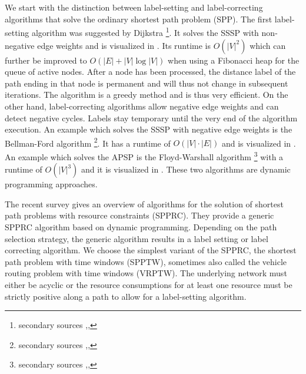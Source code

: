 \section{}
We start with the distinction between label-setting \cite[ch. 4]{ahuja1993network} and label-correcting \cite[ch. 5]{ahuja1993network} algorithms that solve the ordinary shortest path problem (SPP).
The first label-setting algorithm was suggested by Dijkstra \cite{dijkstra1959note}\footnote{secondary sources \cite[sec. 4.5]{ahuja1993network},\cite[sec. 24.3]{cormen2009introduction},\cite[sec. 3.7, p. 83]{jungnickel2013graphs}}. It solves the SSSP with non-negative edge weights and is visualized in \cite{velden2014idp}. Its runtime is $O(|V|^2)$ which can further be improved to $O(|E| + |V| \log |V|)$ when using a Fibonacci heap for the queue of active nodes. After a node has been processed, the distance label of the path ending in that node is permanent and will thus not change in subsequent iterations. The algorithm is a greedy method and is thus very efficient.
On the other hand, label-correcting algorithms allow negative edge weights and can detect negative cycles. Labels stay temporary until the very end of the algorithm execution. An example which solves the SSSP with negative edge weights is the Bellman-Ford algorithm \cite{bellman1958routing,ford1962flows}\footnote{secondary sources \cite[sec. 5.4]{ahuja1993network},\cite[sec. 24.1]{cormen2009introduction},\cite[sec. 3.7, p. 87]{jungnickel2013graphs}}. It has a runtime of $O(|V|\cdot|E|)$ and is visualized in \cite{storz2013idp}. An example which solves the APSP is the Floyd-Warshall algorithm \cite{floyd1962algorithm,warshall1962theorem}\footnote{secondary sources \cite[sec. 5.6]{ahuja1993network},\cite[sec. 25.2]{cormen2009introduction},\cite[sec. 3.9]{jungnickel2013graphs}} with a runtime of $O(|V|^3)$ and it is visualized in \cite{becker2015idp}. These two algorithms are dynamic programming approaches. 

The recent survey \cite{irnich2005shortest} gives an overview of algorithms for the solution of shortest path problems with resource constraints (SPPRC). They provide a generic SPPRC algorithm based on dynamic programming. Depending on the path selection strategy, the generic algorithm results in a label setting or label correcting algorithm. We choose the simplest variant of the SPPRC, the shortest path problem with time windows (SPPTW), sometimes also called the vehicle routing problem with time windows (VRPTW). The underlying network must either be acyclic or the resource consumptions for at least one resource must be strictly positive along a path to allow for a label-setting algorithm. 

